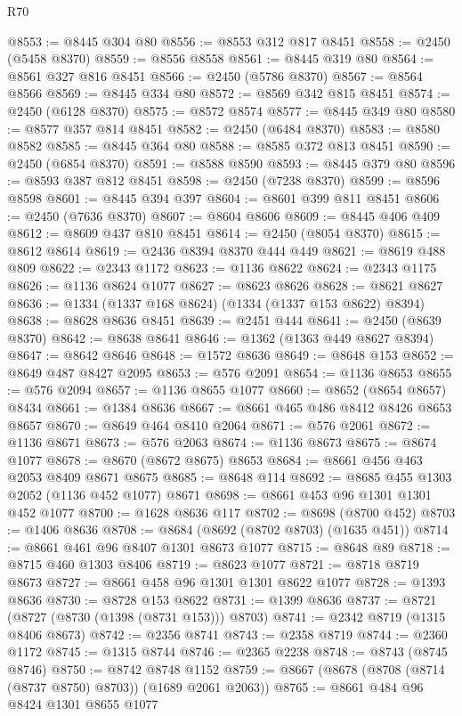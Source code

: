 \begin{lexlean}{R70}
\begin{coremodule}
@8553 := @8445 @304 @80
@8556 := @8553 @312 @817 @8451
@8558 := @2450 (@5458 @8370)
@8559 := @8556 @8558
@8561 := @8445 @319 @80
@8564 := @8561 @327 @816 @8451
@8566 := @2450 (@5786 @8370)
@8567 := @8564 @8566
@8569 := @8445 @334 @80
@8572 := @8569 @342 @815 @8451
@8574 := @2450 (@6128 @8370)
@8575 := @8572 @8574
@8577 := @8445 @349 @80
@8580 := @8577 @357 @814 @8451
@8582 := @2450 (@6484 @8370)
@8583 := @8580 @8582
@8585 := @8445 @364 @80
@8588 := @8585 @372 @813 @8451
@8590 := @2450 (@6854 @8370)
@8591 := @8588 @8590
@8593 := @8445 @379 @80
@8596 := @8593 @387 @812 @8451
@8598 := @2450 (@7238 @8370)
@8599 := @8596 @8598
@8601 := @8445 @394 @397
@8604 := @8601 @399 @811 @8451
@8606 := @2450 (@7636 @8370)
@8607 := @8604 @8606
@8609 := @8445 @406 @409
@8612 := @8609 @437 @810 @8451
@8614 := @2450 (@8054 @8370)
@8615 := @8612 @8614
@8619 := @2436 @8394 @8370 @444 @449
@8621 := @8619 @488 @809
@8622 := @2343 @1172
@8623 := @1136 @8622
@8624 := @2343 @1175
@8626 := @1136 @8624 @1077
@8627 := @8623 @8626
@8628 := @8621 @8627
@8636 := @1334 (@1337 @168 @8624) (@1334 (@1337 @153 @8622) @8394)
@8638 := @8628 @8636 @8451
@8639 := @2451 @444
@8641 := @2450 (@8639 @8370)
@8642 := @8638 @8641
@8646 := @1362 (@1363 @449 @8627 @8394)
@8647 := @8642 @8646
@8648 := @1572 @8636
@8649 := @8648 @153
@8652 := @8649 @487 @8427 @2095
@8653 := @576 @2091
@8654 := @1136 @8653
@8655 := @576 @2094
@8657 := @1136 @8655 @1077
@8660 := @8652 (@8654 @8657) @8434
@8661 := @1384 @8636
@8667 := @8661 @465 @486 @8412 @8426 @8653 @8657
@8670 := @8649 @464 @8410 @2064
@8671 := @576 @2061
@8672 := @1136 @8671
@8673 := @576 @2063
@8674 := @1136 @8673
@8675 := @8674 @1077
@8678 := @8670 (@8672 @8675) @8653
@8684 := @8661 @456 @463 @2053 @8409 @8671 @8675
@8685 := @8648 @114
@8692 := @8685 @455 @1303 @2052 (@1136 @452 @1077) @8671
@8698 := @8661 @453 @96 @1301 @1301 @452 @1077
@8700 := @1628 @8636 @117
@8702 := @8698 (@8700 @452)
@8703 := @1406 @8636
@8708 := @8684 (@8692 (@8702 @8703) (@1635 @451))
@8714 := @8661 @461 @96 @8407 @1301 @8673 @1077
@8715 := @8648 @89
@8718 := @8715 @460 @1303 @8406
@8719 := @8623 @1077
@8721 := @8718 @8719 @8673
@8727 := @8661 @458 @96 @1301 @1301 @8622 @1077
@8728 := @1393 @8636
@8730 := @8728 @153 @8622
@8731 := @1399 @8636
@8737 := @8721 (@8727 (@8730 (@1398 (@8731 @153))) @8703)
@8741 := @2342 @8719 (@1315 @8406 @8673)
@8742 := @2356 @8741
@8743 := @2358 @8719
@8744 := @2360 @1172
@8745 := @1315 @8744
@8746 := @2365 @2238
@8748 := @8743 (@8745 @8746)
@8750 := @8742 @8748 @1152
@8759 := @8667 (@8678 (@8708 (@8714 (@8737 @8750) @8703)) (@1689 @2061 @2063))
@8765 := @8661 @484 @96 @8424 @1301 @8655 @1077

\end{coremodule}
\end{lexlean}
